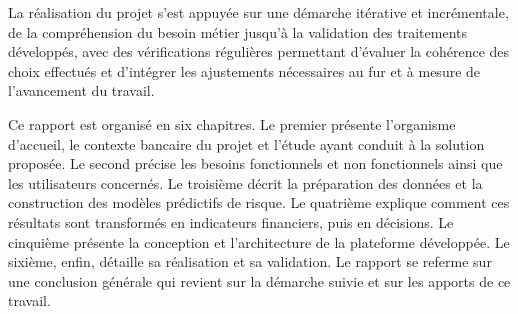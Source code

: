 La réalisation du projet s'est appuyée sur une démarche itérative et incrémentale, de la compréhension du besoin métier jusqu'à la validation des traitements développés, avec des vérifications régulières permettant d'évaluer la cohérence des choix effectués et d'intégrer les ajustements nécessaires au fur et à mesure de l'avancement du travail.

Ce rapport est organisé en six chapitres. Le premier présente l'organisme d'accueil, le contexte bancaire du projet et l'étude ayant conduit à la solution proposée. Le second précise les besoins fonctionnels et non fonctionnels ainsi que les utilisateurs concernés. Le troisième décrit la préparation des données et la construction des modèles prédictifs de risque. Le quatrième explique comment ces résultats sont transformés en indicateurs financiers, puis en décisions. Le cinquième présente la conception et l'architecture de la plateforme développée. Le sixième, enfin, détaille sa réalisation et sa validation. Le rapport se referme sur une conclusion générale qui revient sur la démarche suivie et sur les apports de ce travail.
